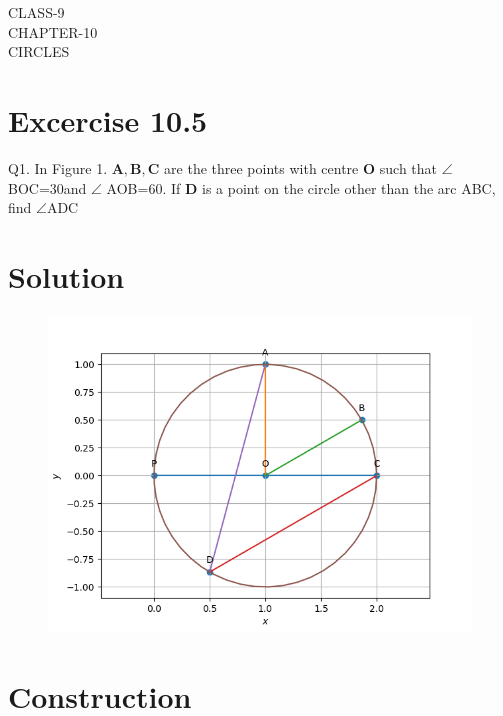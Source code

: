 \documentclass[12pt]{article}
\let\vec\mathbf
\begin{document}
\begin{center}
\textbf\large{CLASS-9\\CHAPTER-10 \\ CIRCLES}

\end{center}
\section*{Excercise 10.5}

Q1. In Figure 1. $\vec{A},\vec{B},\vec{C}$ are the three points with centre $\vec{O}$ such that $\angle$ BOC=30\degree and $\angle$ AOB=60\degree. If $\vec{D}$ is a point on the circle other than the arc ABC, find $\angle$ADC
\section*{\large Solution}
\begin{figure}[h!]
\centering
\includegraphics[width=\columnwidth]{figs/circle2.png}
\caption{}
\label{fig:Fig1}
\end{figure}
\section*{\large Construction}

\begin{table}[h!]
	\small
	\centering
     
	\label{table:table1}
	\end{table}
\end{document}
